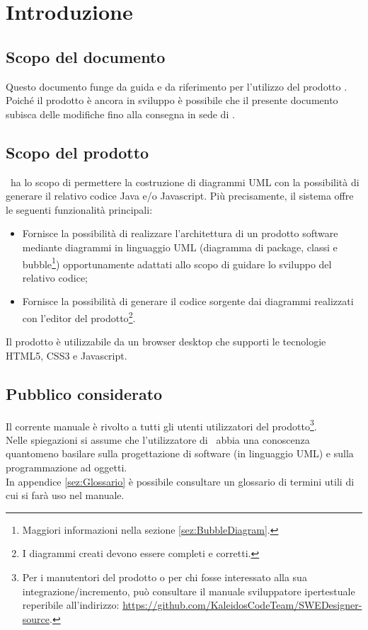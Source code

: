 \documentclass[../ManualeUtente.tex]{subfiles}
\begin{document}
	\section{Introduzione}
		\subsection{Scopo del documento}
			Questo documento funge da guida e da riferimento per l'utilizzo del prodotto
			\progetto.\\
			Poiché il prodotto è ancora in sviluppo è possibile che il presente documento subisca delle modifiche
			fino alla consegna in sede di \revisionediaccettazione.
		\subsection{Scopo del prodotto}
			\progetto\ ha lo scopo di permettere la
			costruzione di diagrammi UML con la possibilità di generare il relativo
			codice Java e/o Javascript.
			Più precisamente, il sistema offre le seguenti funzionalità principali:
			\begin{itemize}
				\item Fornisce la possibilità di realizzare l'architettura di un prodotto software
				mediante diagrammi in linguaggio UML (diagramma di package, classi e
				bubble\footnote{Maggiori informazioni nella sezione \ref{sez:BubbleDiagram}.}) opportunamente
				adattati allo scopo di guidare lo sviluppo del relativo codice;
				\item Fornisce la possibilità di generare il codice sorgente dai diagrammi realizzati
				con l'editor del prodotto\footnote{I diagrammi creati devono essere completi e corretti.}.
			\end{itemize}
			Il prodotto è utilizzabile da un browser desktop che supporti le tecnologie HTML5, CSS3
			e Javascript.
		\subsection{Pubblico considerato}
			Il corrente manuale è rivolto a tutti gli utenti utilizzatori del
			prodotto\footnote{Per i manutentori del prodotto o per chi fosse interessato alla sua integrazione/incremento, può consultare il manuale sviluppatore ipertestuale reperibile all'indirizzo: \url{https://github.com/KaleidosCodeTeam/SWEDesigner-source}.}.\\
			Nelle spiegazioni si assume che l'utilizzatore di \progetto\ abbia una conoscenza quantomeno
			basilare sulla progettazione di software (in linguaggio UML) e sulla programmazione ad oggetti.\\
			In appendice \ref{sez:Glossario} è possibile consultare un glossario di termini utili di cui si
			farà uso nel manuale.
\end{document}
